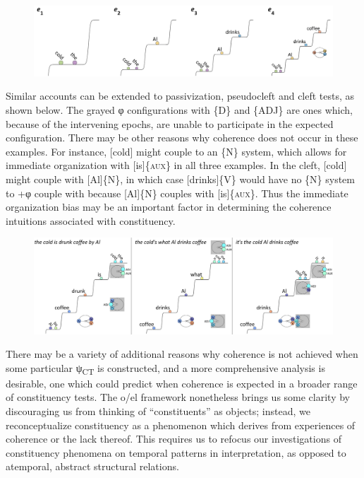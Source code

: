   
\begin{figure}
\includegraphics[width=\textwidth]{figures/Tilsen-img139.png}
\caption{\missingcaption}
\label{fig:}
\end{figure}
 

  Similar accounts can be extended to passivization, pseudocleft and cleft tests, as shown below. The grayed φ configurations with \{D\} and \{ADJ\} are ones which, because of the intervening epochs, are unable to participate in the expected configuration. There may be other reasons why coherence does not occur in these examples. For instance, [cold] might couple to an \{N\} system, which allows for immediate organization with [is]\{\textsc{aux}\} in all three examples. In the cleft, [cold] might couple with [Al]\{N\}, in which case [drinks]\{V\} would have no \{N\} system to +φ couple with because [Al]\{N\} couples with [is]\{\textsc{aux\}.} Thus the immediate organization bias may be an important factor in determining the coherence intuitions associated with constituency.   

  
\begin{figure}
\includegraphics[width=\textwidth]{figures/Tilsen-img140.png}
\caption{\missingcaption}
\label{fig:}
\end{figure}
 

  There may be a variety of additional reasons why coherence is not achieved when some particular ψ\textsubscript{CT} is constructed, and a more comprehensive analysis is desirable, one which could predict when coherence is expected in a broader range of constituency tests. The o/el framework nonetheless brings us some clarity by discouraging us from thinking of “constituents” as objects; instead, we reconceptualize constituency as a phenomenon which derives from experiences of coherence or the lack thereof. This requires us to refocus our investigations of constituency phenomena on temporal patterns in interpretation, as opposed to atemporal, abstract structural relations.

